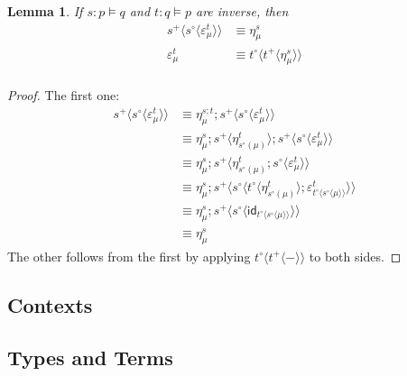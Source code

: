 \documentclass[10pt]{article}
\newtheorem{lemma}{Lemma}
\theoremstyle{definition}
\newcommand{\yields}{\vdash}
\newcommand{\CTX}{\,\,\mathsf{Ctx}}
\newcommand{\ctx}{\,\,\mathsf{mctx}}
\newcommand{\TYPE}{\,\,\mathsf{Type}}
\newcommand{\type}{\,\,\mathsf{mode}}
\newcommand\TrCirc[2]{\ensuremath{{#1}^\circ(#2)}}
\newcommand{\id}{\mathsf{id}}
\newcommand\ApPlus[2]{\ensuremath{{#1}^+ \langle #2 \rangle }}
\newcommand\ApCirc[2]{\ensuremath{{#1}^\circ \langle #2 \rangle }}
\begin{document}
\begin{lemma}
If $s : p \vDash q$ and $t : q \vDash p$ are inverse, then
\begin{align*}
\ApPlus{s}{\ApCirc{s}{\varepsilon^t_\mu}} &\equiv \eta^s_\mu \\
\varepsilon^t_\mu &\equiv \ApCirc{t}{\ApPlus{t}{\eta^s_\mu}} \\
\end{align*}
\end{lemma}
\begin{proof}
The first one:
\begin{align*}
\ApPlus{s}{\ApCirc{s}{\varepsilon^t_\mu}}
&\equiv \eta^{s;t}_\mu ; \ApPlus{s}{\ApCirc{s}{\varepsilon^t_\mu}} \\
&\equiv \eta^s_\mu ; \ApPlus{s}{\eta^t_{\TrCirc{s}{\mu}}} ; \ApPlus{s}{\ApCirc{s}{\varepsilon^t_\mu}} \\
&\equiv \eta^s_\mu ; \ApPlus{s}{\eta^t_{\TrCirc{s}{\mu}};\ApCirc{s}{\varepsilon^t_\mu}} \\
&\equiv \eta^s_\mu ; \ApPlus{s}{\ApCirc{s}{\ApCirc{t}{\eta^t_{\TrCirc{s}{\mu}}};\varepsilon^t_{\ApCirc{t}{\ApCirc{s}{\mu}}}}} \\
&\equiv \eta^s_\mu ; \ApPlus{s}{\ApCirc{s}{\id_{\ApCirc{t}{\ApCirc{s}{\mu}}}}} \\
&\equiv \eta^s_\mu
\end{align*}
The other follows from the first by applying $\ApCirc{t}{\ApPlus{t}{-}}$ to both sides.
\end{proof}

\subsection{Contexts}


\subsection{Types and Terms}
\end{document}
